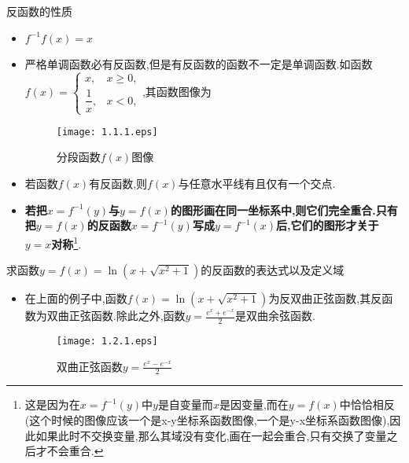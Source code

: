 \documentclass[12pt, a4paper, oneside, UTF8]{ctexbook}  %
\begin{document}
\begin{sloppypar}
    \begin{defn}{反函数的性质}{}
        \begin{itemize}
            \item $f^{-1}f(x)=x$
            \item 严格单调函数必有反函数,但是有反函数的函数不一定是单调函数.如函数$f(x)=\begin{cases}x,&x\geqslant0, \\ \dfrac{1}{x},&x<0,\end{cases}$,其函数图像为
                  \begin{figure}[H]
                      \centering \texttt{[image: 1.1.1.eps]} \caption{分段函数$f(x)$图像}
                      \label{xxx1}
                  \end{figure}
            \item 若函数$f(x)$有反函数,则$f(x)$与任意水平线有且仅有一个交点.
            \item \textbf{若把$x=f^{-1}(y)$与$y=f(x)$的图形画在同一坐标系中,则它们完全重合.只有把$y=f(x)$的反函数$x=f^{-1}(y)$写成$y=f^{-1}(x)$后,它们的图形才关于 $y=x$对称}\footnote{这是因为在$x=f^{-1}(y)$中$y$是自变量而$x$是因变量,而在$y=f(x)$中恰恰相反(这个时候的图像应该一个是x-y坐标系函数图像,一个是y-x坐标系函数图像),因此如果此时不交换变量,那么其域没有变化,画在一起会重合,只有交换了变量之后才不会重合.}.
        \end{itemize}
    \end{defn}
    \begin{problem}
    求函数$y=f(x)=\ln(x+\sqrt{x^2+1})$的反函数的表达式以及定义域
    \end{problem}
    \begin{note}
        \begin{itemize}
            \item 在上面的例子中,函数$f(x)=\ln(x+\sqrt{x^2+1})$为反双曲正弦函数,其反函数为双曲正弦函数.除此之外,函数$y=\frac{e^x+e^{-x}}{2}$是双曲余弦函数.
                  \begin{figure}[H]
                      \begin{minipage}[t]{0.5\linewidth}
                          \centering
                          \texttt{[image: 1.2.1.eps]}
                          \caption{双曲正弦函数$y=\frac{e^x-e^{-x}}{2}$}
                      \end{minipage}%
                      \begin{minipage}[t]{0.5\linewidth}
                          \centering

\end{minipage}
\end{figure}
\end{itemize}
\end{note}
\end{sloppypar}
\end{document}
